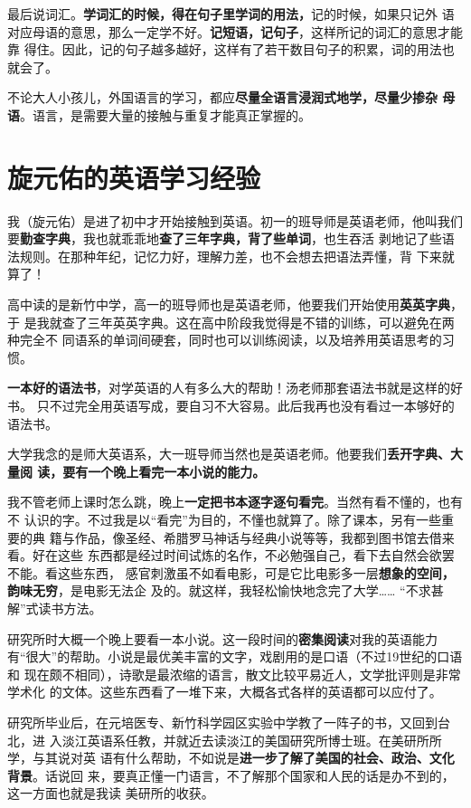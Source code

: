最后说词汇。\textbf{学词汇的时候，得在句子里学词的用法，}记的时候，如果只记外
语对应母语的意思，那么一定学不好。\textbf{记短语，记句子}，这样所记的词汇的意思才能靠
得住。因此，记的句子越多越好，这样有了若干数目句子的积累，词的用法也就会了。

不论大人小孩儿，外国语言的学习，都应\textbf{尽量全语言浸润式地学，尽量少掺杂
  母语}。语言，是需要大量的接触与重复才能真正掌握的。

\section{旋元佑的英语学习经验}

我（旋元佑）是进了初中才开始接触到英语。初一的班导师是英语老师，他叫我们
要\textbf{勤查字典}，我也就乖乖地\textbf{查了三年字典，背了些单词}，也生吞活
剥地记了些语法规则。在那种年纪，记忆力好，理解力差，也不会想去把语法弄懂，背
下来就算了！

高中读的是新竹中学，高一的班导师也是英语老师，他要我们开始使用\textbf{英英字典}，于
是我就查了三年英英字典。这在高中阶段我觉得是不错的训练，可以避免在两种完全不
同语系的单词间硬套，同时也可以训练阅读，以及培养用英语思考的习惯。

\textbf{一本好的语法书}，对学英语的人有多么大的帮助！汤老师那套语法书就是这样的好书。
只不过完全用英语写成，要自习不大容易。此后我再也没有看过一本够好的语法书。

大学我念的是师大英语系，大一班导师当然也是英语老师。他要我们\textbf{丢开字典、大量阅
  读，要有一个晚上看完一本小说的能力。}


我不管老师上课时怎么跳，晚上\textbf{一定把书本逐字逐句看完}。当然有看不懂的，也有不
认识的字。不过我是以“看完”为目的，不懂也就算了。除了课本，另有一些重要的典
籍与作品，像圣经、希腊罗马神话与经典小说等等，我都到图书馆去借来看。好在这些
东西都是经过时间试炼的名作，不必勉强自己，看下去自然会欲罢不能。看这些东西，
感官刺激虽不如看电影，可是它比电影多一层\textbf{想象的空间，韵味无穷}，是电影无法企
及的。就这样，我轻松愉快地念完了大学…… “不求甚解”式读书方法。


研究所时大概一个晚上要看一本小说。这一段时间的\textbf{密集阅读}对我的英语能力
有“很大”的帮助。小说是最优美丰富的文字，戏剧用的是口语（不过19世纪的口语和
现在颇不相同），诗歌是最浓缩的语言，散文比较平易近人，文学批评则是非常学术化
的文体。这些东西看了一堆下来，大概各式各样的英语都可以应付了。

研究所毕业后，在元培医专、新竹科学园区实验中学教了一阵子的书，又回到台北，进
入淡江英语系任教，并就近去读淡江的美国研究所博士班。在美研所所学，与其说对英
语有什么帮助，不如说是\textbf{进一步了解了美国的社会、政治、文化背景}。话说回
来，要真正懂一门语言，不了解那个国家和人民的话是办不到的，这一方面也就是我读
美研所的收获。

